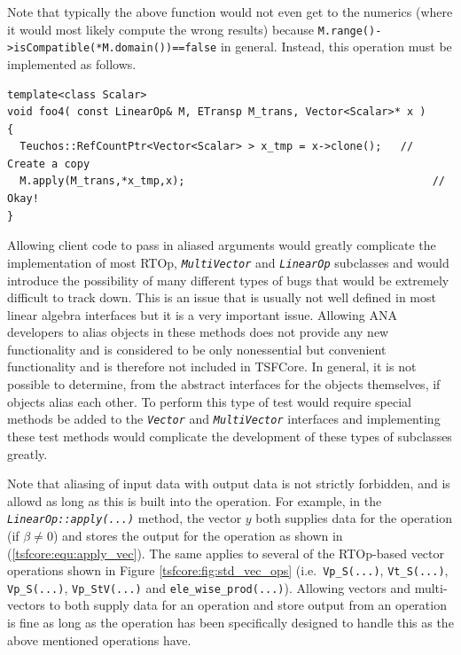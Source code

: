 {}\noindent{}Note that typically the above function would not even get to the numerics
(where it would most likely compute the wrong results) because
\texttt{M.range()->isCompatible(*M.domain())==false} in general.
Instead, this operation must be implemented as follows.

{\scriptsize\begin{verbatim}
template<class Scalar>
void foo4( const LinearOp& M, ETransp M_trans, Vector<Scalar>* x )
{
  Teuchos::RefCountPtr<Vector<Scalar> > x_tmp = x->clone();   // Create a copy
  M.apply(M_trans,*x_tmp,x);                                       // Okay!
}
\end{verbatim}}

{}\noindent{}Allowing client code to pass in aliased arguments would greatly
complicate the implementation of most RTOp,
\texttt{\textit{Multi\-Vector}} and \texttt{\textit{LinearOp}}
subclasses and would introduce the possibility of many different types
of bugs that would be extremely difficult to track down.  This is an
issue that is usually not well defined in most linear algebra
interfaces but it is a very important issue.  Allowing ANA developers
to alias objects in these methods does not provide any new
functionality and is considered to be only nonessential but convenient
functionality and is therefore not included in TSFCore.  In general,
it is not possible to determine, from the abstract interfaces for the
objects themselves, if objects alias each other.  To perform this type
of test would require special methods be added to the
\texttt{\textit{Vector}} and
\texttt{\textit{Multi\-Vector}} interfaces and implementing these test
methods would complicate the development of these types of subclasses
greatly.

Note that aliasing of input data with output data is not strictly
forbidden, and is allowd as long as this is built into the operation.
For example, in the \texttt{\textit{LinearOp\-::apply(\-...)}} method,
the vector $y$ both supplies data for the operation (if $\beta \ne 0$)
and stores the output for the operation as shown in
(\ref{tsfcore:equ:apply_vec}).  The same applies to several of the
RTOp-based vector operations shown in Figure
\ref{tsfcore:fig:std_vec_ops} (i.e.~\texttt{Vp\_S(...)},
\texttt{Vt\_S(...)}, \texttt{Vp\_S(...)}, \texttt{Vp\_StV(...)}
and \texttt{ele\_wise\_prod(...)}).  Allowing vectors and
multi-vectors to both supply data for an operation and store output
from an operation is fine as long as the operation has been
specifically designed to handle this as the above mentioned operations
have.

